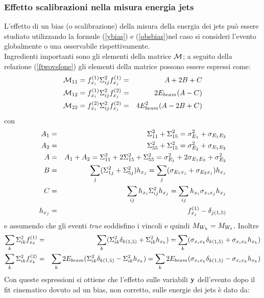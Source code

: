 \subsubsection{Effetto scalibrazioni nella misura energia jets}
L'effetto di un bias (o scalibrazione) della misura della energia dei jets pu\`o essere studiato utilizzando la formule (\ref{ybias}) e (\ref{obsbias})nel caso si consideri l'evento globalmente o una osservabile rispettivamente.\\
Ingredienti importanti sono gli elementi della matrice ${\cal M}$; a seguito della
relazione (\ref{ftwovsfone}) gli elementi della matrice possono essere espressi come:
\begin{eqnarray*}
{\cal M}_{11}=f^{(1)}_{x_i}\Sigma^2_{ij}f^{(1)}_{x_j}&=&A+2B+C\\
{\cal M}_{12}=f^{(1)}_{x_i}\Sigma^2_{ij}f^{(2)}_{x_j}&=&2E_{beam}(A-C)\\
{\cal M}_{22}=f^{(2)}_{x_i}\Sigma^2_{ij}f^{(2)}_{x_j}&=&4E^2_{beam}(A-2B+C)
\end{eqnarray*}
con
\begin{eqnarray}
A_1&=&\Sigma^2_{11}+\Sigma^2_{15}=\sigma^2_{E_1}+\sigma_{E_1E_2}\nonumber\\
A_2&=&\Sigma^2_{55}+\Sigma^2_{15}=\sigma^2_{E_2}+\sigma_{E_1E_2}\nonumber\\
A&=&A_1+A_2=\Sigma^2_{11}+2\Sigma^2_{15}+\Sigma^2_{55}=\sigma^2_{E_1}+2\sigma_{E_1E_2}+\sigma^2_{E_2}\nonumber\\
B&=&\sum_j(\Sigma^2_{1j}+\Sigma^2_{5j})h_{x_j}   =\sum_j(\sigma_{E_1x_j}+\sigma_{E_2x_j})h_{x_j}\nonumber\\
\label{paramdef}
C&=&\sum_{ij}h_{x_i}\Sigma^2_{ij}h_{x_j}=\sum_{ij}h_{x_i}\sigma_{x_ix_j}h_{x_j}\\
\label{comderiv}h_{x_j}&=&f^{(1)}_{x_j}-\delta_{j(1,5)}
\end{eqnarray}
e assumendo che gli eventi {\em true} soddisfino i vincoli e quindi $M_{W_h}=M_{W_\ell}$.
Inoltre
\begin{eqnarray*}
\sum_k\Sigma^2_{ik}f^{(1)}_{x_k}&=&\sum_k(\Sigma^2_{ik}\delta_{k(1,5)}+\Sigma^2_{ik}h_{x_k})=\sum_k(\sigma_{x_ix_k}\delta_{k(1,5)}+\sigma_{x_ix_k}h_{x_k})\\
\sum_k\Sigma^2_{ik}f^{(2)}_{x_k}&=&\sum_k2E_{beam}(\Sigma^2_{ik}\delta_{k(1,5)}-\Sigma^2_{ik}h_{x_k})=\sum_k2E_{beam}(\sigma_{x_ix_k}\delta_{k(1,5)}-\sigma_{x_ix_k}h_{x_k})
\end{eqnarray*}
Con queste espressioni si ottiene che l'effetto sulle variabili ${\bf y}$ dell'evento
dopo il fit cinematico dovuto ad un bias, non corretto, sulle energie dei jets \`e dato da:
